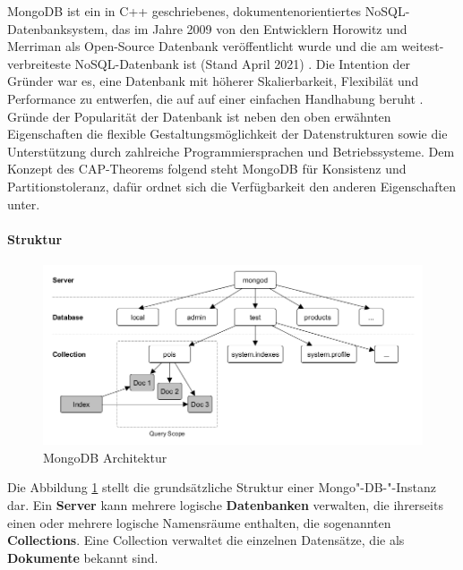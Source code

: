 MongoDB ist ein in C++ geschriebenes, dokumentenorientiertes NoSQL-Datenbanksystem, das im Jahre 2009 von den Entwicklern Horowitz und Merriman als Open-Source Datenbank veröffentlicht wurde und die am weitest-verbreiteste NoSQL-Datenbank ist (Stand April 2021) \cite{DB1.7}. Die Intention der Gründer war es, eine Datenbank mit höherer Skalierbarkeit, Flexibilät und Performance zu entwerfen, die auf auf einer einfachen Handhabung beruht \cite{DB1.65}.
Gründe der Popularität der Datenbank ist neben den oben erwähnten Eigenschaften die flexible Gestaltungsmöglichkeit der Datenstrukturen sowie die Unterstützung durch zahlreiche Programmiersprachen und Betriebssysteme.
\noindent
Dem Konzept des CAP-Theorems folgend steht MongoDB für Konsistenz und Partitionstoleranz, dafür ordnet sich die Verfügbarkeit den anderen Eigenschaften unter.
\newline

\paragraph{Struktur}

\begin{figure}[tbt]
\centering
\includegraphics[width=14cm]{images/MongoDB_Architektur.png}
\caption[MongoDB Architektur]{MongoDB Architektur \protect \footnotemark}
\label{fig:MongoDBArchitektur}
\end{figure}

\noindent
Die Abbildung \ref{fig:MongoDBArchitektur} stellt die grundsätzliche Struktur einer Mongo"-DB-"-Instanz dar.
Ein \textbf{Server} kann mehrere logische \textbf{Datenbanken} verwalten, die ihrerseits einen oder mehrere logische Namensräume enthalten, die sogenannten \textbf{Collections}. Eine Collection verwaltet die einzelnen Datensätze, die als \textbf{Dokumente} bekannt sind.  \\

